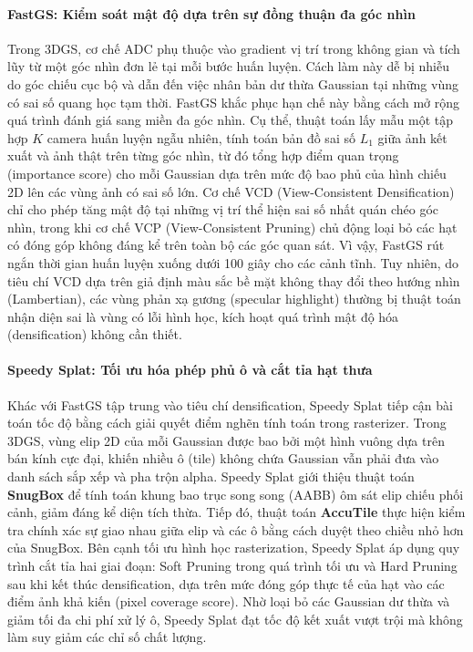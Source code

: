 \paragraph{FastGS: Kiểm soát mật độ dựa trên sự đồng thuận đa góc nhìn}
\label{para:fastgs-detail}
Trong 3DGS, cơ chế ADC phụ thuộc vào gradient vị trí trong không gian và tích lũy từ một góc nhìn đơn lẻ tại mỗi bước huấn luyện. Cách làm này dễ bị nhiễu do góc chiếu cục bộ và dẫn đến việc nhân bản dư thừa Gaussian tại những vùng có sai số quang học tạm thời. FastGS \cite{ren2025fastgs} khắc phục hạn chế này bằng cách mở rộng quá trình đánh giá sang miền đa góc nhìn. Cụ thể, thuật toán lấy mẫu một tập hợp $K$ camera huấn luyện ngẫu nhiên, tính toán bản đồ sai số $L_1$ giữa ảnh kết xuất và ảnh thật trên từng góc nhìn, từ đó tổng hợp điểm quan trọng (importance score) cho mỗi Gaussian dựa trên mức độ bao phủ của hình chiếu 2D lên các vùng ảnh có sai số lớn. Cơ chế VCD (View-Consistent Densification) chỉ cho phép tăng mật độ tại những vị trí thể hiện sai số nhất quán chéo góc nhìn, trong khi cơ chế VCP (View-Consistent Pruning) chủ động loại bỏ các hạt có đóng góp không đáng kể trên toàn bộ các góc quan sát. Vì vậy, FastGS rút ngắn thời gian huấn luyện xuống dưới 100 giây cho các cảnh tĩnh. Tuy nhiên, do tiêu chí VCD dựa trên giả định màu sắc bề mặt không thay đổi theo hướng nhìn (Lambertian), các vùng phản xạ gương (specular highlight) thường bị thuật toán nhận diện sai là vùng có lỗi hình học, kích hoạt quá trình mật độ hóa (densification) không cần thiết.

\paragraph{Speedy Splat: Tối ưu hóa phép phủ ô và cắt tỉa hạt thưa}
\label{para:speedysplat-detail}
Khác với FastGS tập trung vào tiêu chí densification, Speedy Splat \cite{hanson2024speedysplat} tiếp cận bài toán tốc độ bằng cách giải quyết điểm nghẽn tính toán trong rasterizer. Trong 3DGS, vùng elip 2D của mỗi Gaussian được bao bởi một hình vuông dựa trên bán kính cực đại, khiến nhiều ô (tile) không chứa Gaussian vẫn phải đưa vào danh sách sắp xếp và pha trộn alpha. Speedy Splat giới thiệu thuật toán \textbf{SnugBox} để tính toán khung bao trục song song (AABB) ôm sát elip chiếu phối cảnh, giảm đáng kể diện tích thừa. Tiếp đó, thuật toán \textbf{AccuTile} thực hiện kiểm tra chính xác sự giao nhau giữa elip và các ô bằng cách duyệt theo chiều nhỏ hơn của SnugBox. Bên cạnh tối ưu hình học rasterization, Speedy Splat áp dụng quy trình cắt tỉa hai giai đoạn: Soft Pruning trong quá trình tối ưu và Hard Pruning sau khi kết thúc densification, dựa trên mức đóng góp thực tế của hạt vào các điểm ảnh khả kiến (pixel coverage score). Nhờ loại bỏ các Gaussian dư thừa và giảm tối đa chi phí xử lý ô, Speedy Splat đạt tốc độ kết xuất vượt trội mà không làm suy giảm các chỉ số chất lượng.

